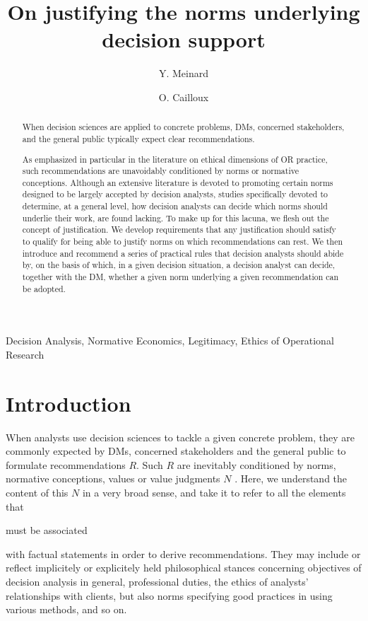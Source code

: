 \documentclass[preprint, french, english, 11pt, authoryear]{elsarticle}%
\begin{document}
\hypersetup{citecolor=black}
\title{On justifying the norms underlying decision support}

\author[ld]{Y. Meinard}
\author[ld]{O. Cailloux}
\address[ld]{Universit\'e Paris-Dauphine, PSL Research University, CNRS, UMR [7243], LAMSADE, 75016 PARIS, FRANCE}

\begin{abstract}
When decision sciences are applied to concrete problems, \acp{DM}, concerned stakeholders, and the general public typically expect clear recommendations.
\begin{changebar}As emphasized in particular in the literature on ethical dimensions of \ac{OR} practice, such recommendations are unavoidably conditioned by norms or normative conceptions.
Although an extensive literature is devoted to promoting certain norms designed to be largely accepted by decision analysts, studies specifically devoted to determine, at a general level, how decision analysts can decide which norms should underlie their work, are found lacking.
To make up for this lacuna, we flesh out the concept of justification. 
We develop requirements that any justification should satisfy to qualify for being able to justify norms on which recommendations can rest.
We then introduce and recommend a series of practical rules that decision analysts should abide by, on the basis of which, in a given decision situation, a decision analyst can decide, together with the \ac{DM}, whether a given norm underlying a given recommendation can be adopted.\end{changebar}

\end{abstract}
\acresetall
\begin{keyword}
Decision Analysis, Normative Economics, Legitimacy, Ethics of Operational Research
\end{keyword}

\maketitle

\section{Introduction}
When analysts use decision sciences to tackle a given concrete problem, they are commonly expected by \acp{DM}, concerned stakeholders and the general public to formulate recommendations $R$. 
Such $R$ are inevitably conditioned by norms, normative conceptions, values or value judgments $N$ \citep{funtowicz_science_1993,brans_ethics_2002,mingers_ethics_2011}.
Here, we understand the content of this $N$ in a very broad sense, and take it to refer to all the elements that \begin{changebar} must be associated \end{changebar}with factual statements in order to derive recommendations. 
They may include or reflect implicitely or explicitely held philosophical stances concerning objectives of decision analysis in general, professional duties, the ethics of analysts' relationships with clients, but also norms specifying good practices in using various methods, and so on.
\end{document}
